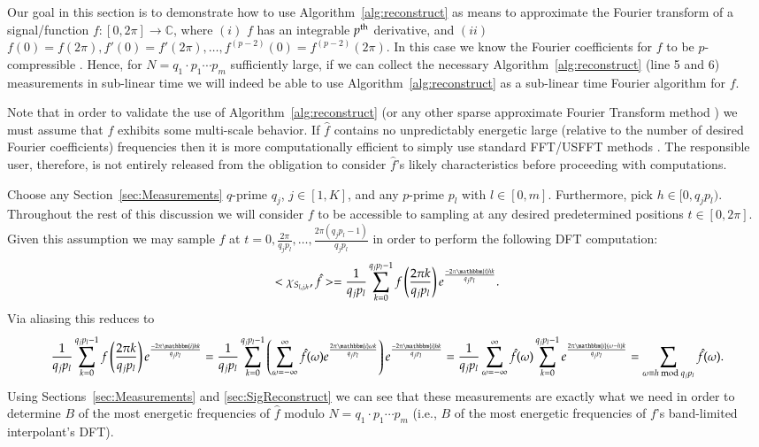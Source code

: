 \documentclass{article}
\begin{document}
Our goal in this section is to demonstrate how to use Algorithm~\ref{alg:reconstruct} as means to approximate the Fourier transform of a signal/function $f: [0, 2 \pi] \rightarrow \mathbb{C}$, where $(i)$ $f$ has an integrable $p^{\rm th}$ derivative, and $(ii)$ $f(0) = f(2 \pi), f'(0) = f'(2 \pi), \dots, f^{(p-2)}(0) = f^{(p-2)}(2 \pi)$.  In this case we know the Fourier coefficients for $f$ to be $p$-compressible \cite{BoydAl,FourierCont}.  Hence, for $N = q_{1} \cdot p_{1} \cdots p_{m}$ sufficiently large, if we can collect the necessary Algorithm~\ref{alg:reconstruct} (line 5 and 6) measurements in sub-linear time we will indeed be able to use Algorithm~\ref{alg:reconstruct} as a sub-linear time Fourier algorithm for $f$.  

Note that in order to validate the use of Algorithm~\ref{alg:reconstruct} (or any other sparse approximate Fourier Transform method \cite{AAFFT1,AAFFT2}) we must assume that $f$ exhibits some multi-scale behavior.  If $\hat{f}$ contains no unpredictably energetic large (relative to the number of desired Fourier coefficients) frequencies then it is more computationally efficient to simply use standard FFT/USFFT methods \cite{FFT,AUSFFTrev,AUSFFT,USFFT1,USFFT2}.  The responsible user, therefore, is not entirely released from the obligation to consider $\hat{f}$'s likely characteristics before proceeding with computations.

Choose any Section~\ref{sec:Measurements} $q$-prime $q_{j}$, $j \in [1,K]$, and any $p$-prime $p_{l}$ with $l \in [0,m]$.  Furthermore, pick $h \in [0,q_{j}p_{l})$.  Throughout the rest of this discussion we will consider $f$ to be accessible to sampling at any desired predetermined positions $t \in [0,2 \pi]$.  Given this assumption we may sample $f$ at $t = 0, \frac{2 \pi}{q_{j}p_{l}}, \dots, \frac{2 \pi (q_{j}p_{l} - 1)}{q_{j}p_{l}}$ in order to perform the following DFT computation:
$$ <\chi_{S_{l,j,h}}, \hat{f}> = \frac{1}{q_{j}p_{l}} \sum^{q_{j}p_{l}-1}_{k = 0} f \left( \frac{2 \pi k}{q_{j}p_{l}} \right) e^{\frac{- 2 \pi \mathbbm{i} h k}{q_{j}p_{l}}}.$$
Via aliasing \cite{BoydAl} this reduces to
$$\frac{1}{q_{j}p_{l}} \sum^{q_{j}p_{l}-1}_{k = 0} f \left( \frac{2 \pi k}{q_{j}p_{l}} \right) e^{\frac{- 2 \pi \mathbbm{i} h k}{q_{j}p_{l}}} = \frac{1}{q_{j}p_{l}} \sum^{q_{j}p_{l}-1}_{k = 0} \left( \sum^{\infty}_{\omega = - \infty} \hat{f}(\omega) e^{\frac{2 \pi \mathbbm{i} \omega k}{q_{j}p_{l}}} \right) e^{\frac{- 2 \pi \mathbbm{i} h k}{q_{j}p_{l}}} = \frac{1}{q_{j}p_{l}} \sum^{\infty}_{\omega = - \infty} \hat{f}(\omega) \sum^{q_{j}p_{l}-1}_{k = 0} e^{\frac{2 \pi \mathbbm{i} (\omega - h) k}{q_{j}p_{l}}} = \sum_{\omega \equiv h \textrm{ mod } q_{j}p_{l}} \hat{f}(\omega).$$
Using Sections~\ref{sec:Measurements} and \ref{sec:SigReconstruct} we can see that these measurements are exactly what we need in order to determine $B$ of the most energetic frequencies of $\hat{f}$ modulo $N = q_{1} \cdot p_{1} \cdots p_{m}$ (i.e., $B$ of the most energetic frequencies of $f$'s band-limited interpolant's DFT).  
\end{document}
